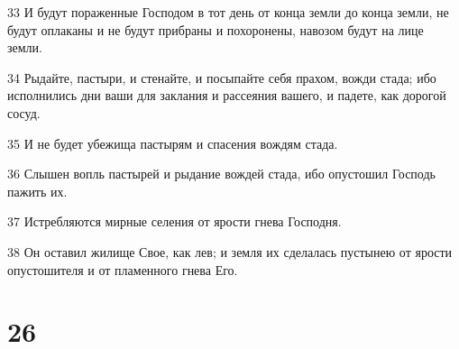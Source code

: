 \par 33 И будут пораженные Господом в тот день от конца земли до конца земли, не будут оплаканы и не будут прибраны и похоронены, навозом будут на лице земли.
\par 34 Рыдайте, пастыри, и стенайте, и посыпайте себя прахом, вожди стада; ибо исполнились дни ваши для заклания и рассеяния вашего, и падете, как дорогой сосуд.
\par 35 И не будет убежища пастырям и спасения вождям стада.
\par 36 Слышен вопль пастырей и рыдание вождей стада, ибо опустошил Господь пажить их.
\par 37 Истребляются мирные селения от ярости гнева Господня.
\par 38 Он оставил жилище Свое, как лев; и земля их сделалась пустынею от ярости опустошителя и от пламенного гнева Его.

\chapter{26}

